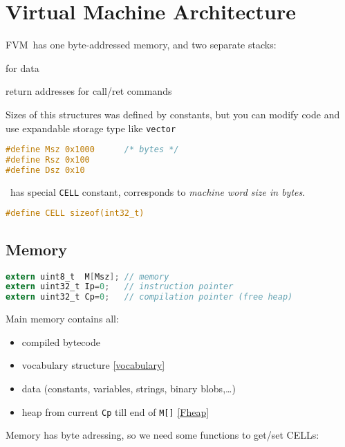\section{Virtual Machine Architecture}

FVM\ has one byte-addressed memory, and two separate
stacks:
\begin{description}[nosep]
\item[data stack] for data 
\item[return stack] return addresses for call/ret commands
\end{description}

\bigskip
Sizes of this structures was defined by constants, but you can modify code and
use expandable storage type like \verb|vector|

\begin{lstlisting}[language=C]
#define Msz 0x1000		/* bytes */
#define Rsz 0x100
#define Dsz 0x10 
\end{lstlisting}

\clearpage\noindent
\F\ has special \verb|CELL| constant, corresponds to \textit{machine word size
in bytes}.

\begin{lstlisting}[language=C]
#define CELL sizeof(int32_t)
\end{lstlisting}

\subsection{Memory}

\begin{lstlisting}[language=C]
extern uint8_t  M[Msz];	// memory
extern uint32_t Ip=0;	// instruction pointer
extern uint32_t Cp=0;	// compilation pointer (free heap)
\end{lstlisting}

Main memory contains all:
\begin{itemize}[nosep]
  \item compiled bytecode
  \item vocabulary structure \ref{vocabulary}
  \item data (constants, variables, strings, binary blobs,\ldots)
  \item heap from current \verb|Cp| till end of \verb|M[]| \ref{Fheap}
\end{itemize}

Memory has byte adressing, so we need some functions to get/set CELLs:

